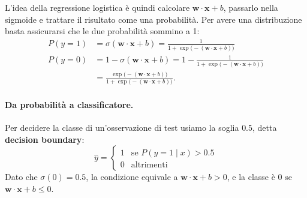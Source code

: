 L'idea della regressione logistica è quindi calcolare $\mathbf{w} \cdot \mathbf{x} + b$, passarlo nella sigmoide e trattare il risultato come una probabilità. Per avere una distribuzione basta assicurarsi che le due probabilità sommino a 1:
\begin{align}
P(y = 1) &= \sigma(\mathbf{w} \cdot \mathbf{x} + b) = \frac{1}{1 + \exp\big(-(\mathbf{w} \cdot \mathbf{x} + b)\big)} \\
P(y = 0) &= 1 - \sigma(\mathbf{w} \cdot \mathbf{x} + b) = 1 - \frac{1}{1 + \exp\big(-(\mathbf{w} \cdot \mathbf{x} + b)\big)} \nonumber \\
&= \frac{\exp\big(-(\mathbf{w} \cdot \mathbf{x} + b)\big)}{1 + \exp\big(-(\mathbf{w} \cdot \mathbf{x} + b)\big)}.
\end{align}

\paragraph{Da probabilità a classificatore.} Per decidere la classe di un'osservazione di test usiamo la soglia $0.5$, detta \textbf{decision boundary}:
\begin{equation}
\hat{y} = \begin{cases} 1 & \text{se } P(y = 1 \mid x) > 0.5 \\ 0 & \text{altrimenti} \end{cases}
\end{equation}
Dato che $\sigma(0) = 0.5$, la condizione equivale a $\mathbf{w} \cdot \mathbf{x} + b > 0$, e la classe è 0 se $\mathbf{w} \cdot \mathbf{x} + b \leq 0$.

